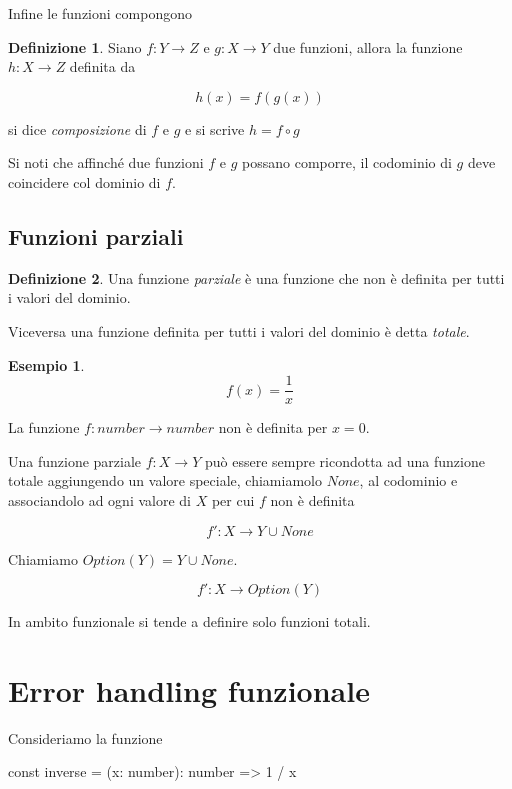 \documentclass[12pt]{article}
\theoremstyle{definition}
\newtheorem{definition}{Definizione}[section]
\newtheorem{example}{Esempio}[section]
\newenvironment{code}
  {\vspace{0.5cm} \VerbatimEnvironment\begin{typescriptcode}}
  {\end{typescriptcode} \vspace{0.2cm}}
\begin{document}
Infine le funzioni compongono

\begin{definition}
Siano $f: Y \rightarrow Z$ e $g: X \rightarrow Y$ due funzioni, allora la funzione $h: X \rightarrow Z$ definita da

$$
h(x) = f(g(x))
$$

si dice \emph{composizione} di $f$ e $g$ e si scrive $h = f \circ g$

\end{definition}

Si noti che affinché due funzioni $f$ e $g$ possano comporre, il codominio di $g$ deve coincidere col dominio di $f$.

\subsection{Funzioni parziali}

\begin{definition}
Una funzione \emph{parziale} è una funzione che non è definita per tutti i valori del dominio.
\end{definition}

Viceversa una funzione definita per tutti i valori del dominio è detta \emph{totale}.

\begin{example}
$$
f(x) = \frac{1}{x}
$$
\end{example}

La funzione $f: number \rightarrow number$ non è definita per $x = 0$.

Una funzione parziale $f: X \rightarrow Y$ può essere sempre ricondotta ad una funzione totale aggiungendo un valore speciale,
chiamiamolo $None$, al codominio e associandolo ad ogni valore di $X$ per cui $f$ non è definita

$$
f': X \rightarrow Y \cup None
$$

Chiamiamo $Option(Y) = Y \cup None$.

$$
f': X \rightarrow Option(Y)
$$

In ambito funzionale si tende a definire solo funzioni totali.

\newpage

\section{Error handling funzionale}

Consideriamo la funzione

\begin{code}
const inverse = (x: number): number => 1 / x
\end{code}
\end{document}
